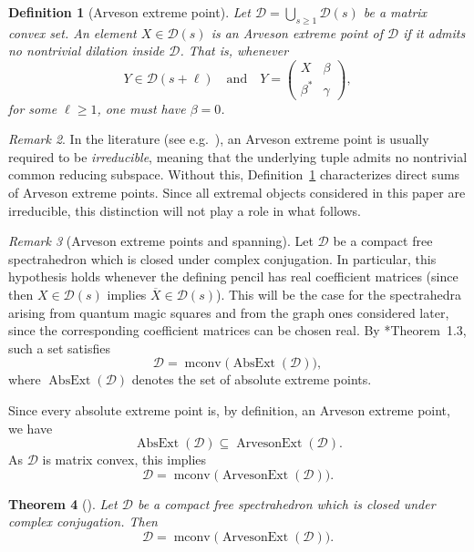 \documentclass[11pt, a4paper]{article}
\theoremstyle{plain}
\newtheorem{theorem}{Theorem}[section]
\newtheorem{definition}[theorem]{Definition}
\theoremstyle{definition}
\theoremstyle{remark}
\newtheorem{remark}[theorem]{Remark}
\begin{document}
\begin{definition}[Arveson extreme point]\label{def:arveson}
Let \(\mathcal D = \bigcup_{s \ge 1} \mathcal D(s)\) be a matrix convex set.
An element \(X \in \mathcal D(s)\) is an \emph{Arveson extreme point} of \(\mathcal D\)
if it admits no nontrivial dilation inside \(\mathcal D\).
That is, whenever
\[
Y \in \mathcal D(s+\ell)
\quad \text{and} \quad
Y =
\begin{pmatrix}
X & \beta \\
\beta^* & \gamma
\end{pmatrix},
\]
for some \(\ell \ge 1\), one must have \(\beta = 0\).
\end{definition}
\begin{remark}
In the literature (see e.g.~\cite{EH19}), an Arveson extreme point is usually
required to be \emph{irreducible}, meaning that the underlying tuple admits no
nontrivial common reducing subspace.
Without this, Definition~\ref{def:arveson} characterizes
direct sums of Arveson extreme points.
Since all extremal objects considered in this paper are irreducible, this
distinction will not play a role in what follows.
\end{remark}
\begin{remark}[Arveson extreme points and spanning]\label{rem:arveson-span}
Let \(\mathcal D\) be a compact free spectrahedron which is closed under complex conjugation.
In particular, this hypothesis holds whenever the defining pencil has real coefficient matrices (since then \(X \in \mathcal D(s)\) implies \(\overline{X}\in \mathcal D(s)\)).
This will be the case for the spectrahedra arising from quantum magic squares and from the graph ones considered later, since the corresponding coefficient matrices can be chosen real. By \cite{EH19}*{Theorem~1.3}, such a set satisfies
\[
\mathcal D
=
\operatorname{mconv}\bigl(\operatorname{AbsExt}(\mathcal D)\bigr),
\]
where \(\operatorname{AbsExt}(\mathcal D)\) denotes the set of absolute extreme points.

Since every absolute extreme point is, by definition, an Arveson extreme point,
we have
\[
\operatorname{AbsExt}(\mathcal D)
\subseteq
\operatorname{ArvesonExt}(\mathcal D).
\]
As \(\mathcal D\) is matrix convex, this implies
\[
\mathcal D
=
\operatorname{mconv}\bigl(\operatorname{ArvesonExt}(\mathcal D)\bigr).
\]
\end{remark}

\begin{theorem}[\cite{EH19}]\label{thm:EvertHelton}
Let \(\mathcal{D}\) be a compact free spectrahedron which is closed under complex conjugation.
Then
\[
\mathcal{D}
=
\operatorname{mconv}\bigl(\operatorname{ArvesonExt}(\mathcal{D})\bigr).
\]
\end{theorem}
\end{document}

